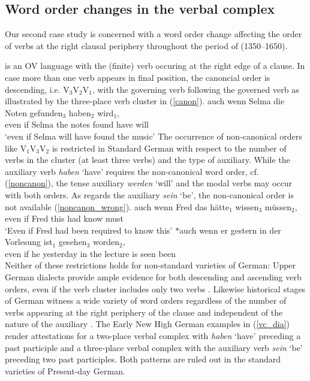 \documentclass[output=paper
                ,modfonts
                ,nonflat
	        ,collection
	        ,collectionchapter
	        ,collectiontoclongg
 	        ,biblatex
                ,babelshorthands
                ,newtxmath
                ,draftmode
                ,colorlinks, citecolor=brown
]{./langsci/langscibook}
\begin{document}
\subsection{Word order changes in the verbal complex \label{VC}} 

Our second case study is concerned with a word order change affecting the order of verbs at the right clausal periphery throughout the period of  (1350--1650). 

 is an OV language with the (finite) verb occuring at the right edge of a clause. In case more than one verb appears in final position, the canoncial order is descending, i.e. V$_3$V$_2$V$_1$, with the governing verb following the governed verb as illustrated by the three-place verb cluster in (\ref{canon}). 
\ea \label{canon}
\gll auch wenn Selma die Noten gefunden$_3$ haben$_2$ wird$_1$, \\ even if Selma the notes found have will \\
\glt `even if Selma will have found the music'
\z
The occurrence of non-canonical orders like V$_1$V$_3$V$_2$ is restricted in Standard German with respect to the number of verbs in the cluster (at least three verbs) and the type of auxiliary. While the auxiliary verb \textit{haben} `have' requires the non-canonical word order, cf. (\ref{noncanon}), the tense auxiliary \textit{werden} `will' and the modal verbs may occur with both orders. As regards the auxiliary \textit{sein} `be', the non-canonical order is not available (\ref{noncanon_wrong}).  
\eal
\ex \label{noncanon}
\gll auch wenn Fred das hätte$_1$ wissen$_3$ müssen$_2$, \\ even if Fred this had know must \\
\glt `Even if Fred had been required to know this'
\ex \label{noncanon_wrong}
\gll $*$auch wenn er gestern in der Vorlesung ist$_1$ gesehen$_3$ worden$_2$, \\ even if he yesterday in the lecture is seen been   \\
\zl
Neither of these restrictions holds for non-standard varieties of German: Upper German dialects provide ample evidence for both descending and ascending verb orders, even if the verb cluster includes only two verbs \citep{dubenion2010}. Likewise historical stages of German witness a wide variety of word orders regardless of the number of verbs appearing at the right periphery of the clause and independent of the nature of the auxiliary \citep{ebert1981,haerd1981,sapp2011}. The Early New High German examples in (\ref{vc_dia}) render attestations for a two-place verbal complex with \textit{haben} `have' preceding a past participle and a three-place verbal complex with the auxiliary verb \textit{sein} `be' preceding two past participles. Both patterns are ruled out in the standard varieties of Present-day German.
\end{document}
